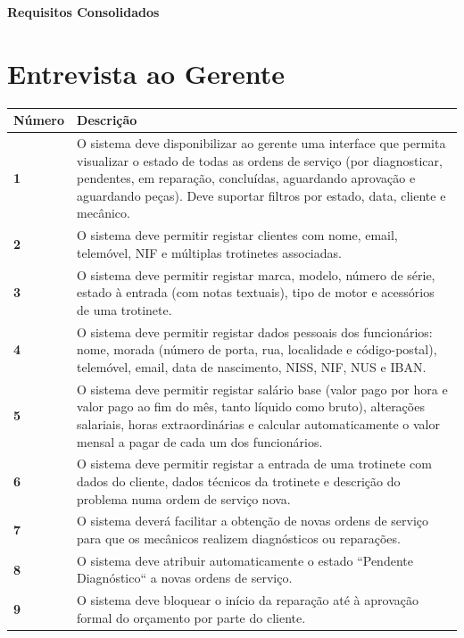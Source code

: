 \documentclass[11pt,a4paper]{article}
\begin{document}
	
	{\noindent\LARGE\bfseries\color{primaryblue} Requisitos Consolidados}
	
	\section*{Entrevista ao Gerente}
	
	\renewcommand{\arraystretch}{1.5}
	\begin{tabularx}{\textwidth}{@{}|l|X|@{}}
		\hline
		\rowcolor{gray!10} \textbf{Número} & \textbf{Descrição} \\ \hline
		\textbf{1} & O sistema deve disponibilizar ao gerente uma interface que permita visualizar o estado de todas as ordens de serviço (por diagnosticar, pendentes, em reparação, concluídas, aguardando aprovação e aguardando peças). Deve suportar filtros por estado, data, cliente e mecânico. \\ \hline
		\textbf{2}  & O sistema deve permitir registar clientes com nome, email, telemóvel, NIF e múltiplas trotinetes associadas. \\ \hline
		\textbf{3}  & O sistema deve permitir registar marca, modelo, número de série, estado à entrada (com notas textuais), tipo de motor e acessórios de uma trotinete. \\ \hline
		\textbf{4}  & O sistema deve permitir registar dados pessoais dos funcionários: nome, morada (número de porta, rua, localidade e código-postal), telemóvel, email, data de nascimento, NISS, NIF, NUS e IBAN. \\ \hline
		\textbf{5}  & O sistema deve permitir registar salário base (valor pago por hora e valor pago ao fim do mês, tanto líquido como bruto), alterações salariais, horas extraordinárias e calcular automaticamente o valor mensal a pagar de cada um dos funcionários. \\ \hline
		\textbf{6}  & O sistema deve permitir registar a entrada de uma trotinete com dados do cliente, dados técnicos da trotinete e descrição do problema numa ordem de serviço nova. \\ \hline
		\textbf{7}  & O sistema deverá facilitar a obtenção de novas ordens de serviço para que os mecânicos realizem diagnósticos ou reparações. \\ \hline
		\textbf{8}  & O sistema deve atribuir automaticamente o estado ``Pendente Diagnóstico`` a novas ordens de serviço. \\ \hline
		\textbf{9}  & O sistema deve bloquear o início da reparação até à aprovação formal do orçamento por parte do cliente. \\ \hline

\end{tabularx}
\end{document}
